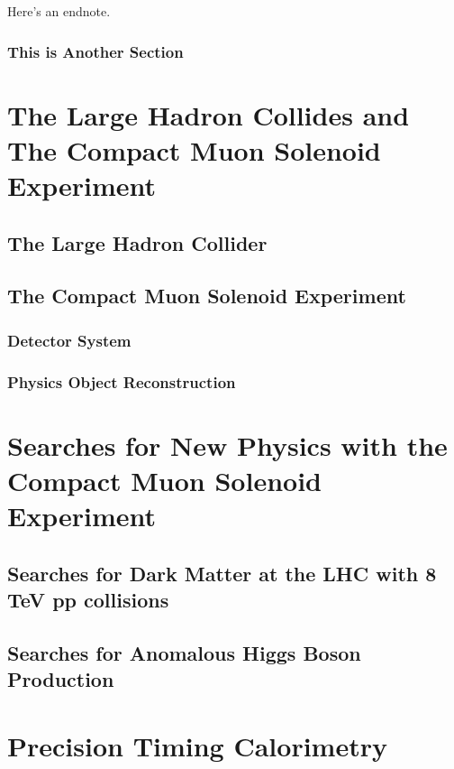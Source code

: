 \documentclass[14pt]{caltech_thesis}
\begin{document}
\lipsum[3] 

\lipsum[4-5] 

Here's an endnote.

\section{This is Another Section}
\lipsum[6-7] 

\part{The Large Hadron Collides and The Compact Muon Solenoid Experiment}

\chapter{The Large Hadron Collider}

\chapter{The Compact Muon Solenoid Experiment}
\section{Detector System}

\section{Physics Object Reconstruction}


\part{ Searches for New Physics with the Compact Muon Solenoid Experiment}
\chapter{Searches for Dark Matter at the LHC with 8 TeV pp collisions}

\chapter{Searches for Anomalous Higgs Boson Production}


\part{ Precision Timing Calorimetry}

\end{document}
